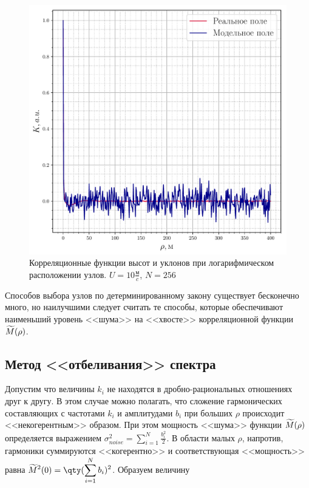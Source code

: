 \begin{figure}[h!]
\begin{minipage}{0.49\linewidth}
			\includegraphics[width=\linewidth]{fig/correlation_angles_slopes1.pdf}
	\end{minipage}
	\caption{Корреляционные функции высот и уклонов при логарифмическом расположении узлов. $U=10 \frac{\text{м}}{c}$, $N=256$}
	\label{fig:ca1}		
\end{figure}



Способов выбора узлов по детерминированному закону существует бесконечно много, но наилучшими следует считать те способы, которые обеспечивают наименьший уровень <<шума>> на <<хвосте>> корреляционной функции $\widetilde{M}(\rho)$.

\subsection{Метод <<отбеливания>> спектра}
Допустим что величины $k_i$ не находятся в дробно-рациональных отношениях друг к другу. В этом случае можно полагать, что сложение гармонических составляющих с частотами $k_i$ и амплитудами $b_i$ при больших $\rho$ происходит <<некогерентным>> образом. При этом мощность <<шума>> функции $\widetilde{M}(\rho)$ определяется выражением 
$\displaystyle \sigma^2_{noise}= \sum_{i=1}^N \frac{b_i^2}{2}$. В области малых $\rho$, напротив, гармоники суммируются <<когерентно>> и соответствующая <<мощность>> равна 
$\displaystyle \tM^2(0)=\qty(\sum_{i=1}^N b_i)^2$. Образуем величину 


